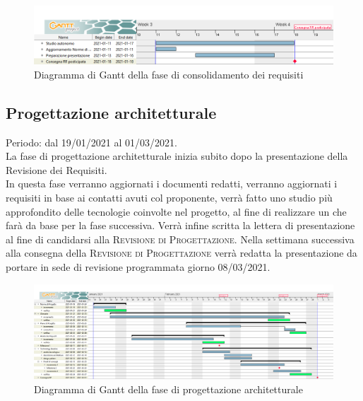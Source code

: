 \documentclass[../piano_di_progetto.tex]{subfiles}
\begin{document}
\begin{figure}[H]
\centering
\includegraphics[width=18cm]{img/01_RR_consolidamento.png}
\caption{ Diagramma di Gantt della fase di consolidamento dei requisiti}
\end{figure}

\subsection{Progettazione architetturale}%
\label{sub:prog_arc}
Periodo: dal 19/01/2021 al 01/03/2021.\\
La fase di progettazione architetturale inizia subito dopo la presentazione della Revisione dei Requisiti.\\
In questa fase verranno aggiornati i documenti redatti, verranno aggiornati i requisiti in base ai contatti avuti col proponente, verrà fatto uno studio più approfondito delle tecnologie coinvolte nel progetto, al fine di realizzare un  che farà da base per la fase successiva. Verrà infine scritta la lettera di presentazione al fine di candidarsi alla \textsc{Revisione di Progettazione}. Nella settimana successiva alla consegna della \textsc{Revisione di Progettazione} verrà redatta la presentazione da portare in sede di revisione programmata giorno 08/03/2021. 

\begin{figure}[H]
\centering
\includegraphics[width=18cm]{img/02_RP.png}
\caption{Diagramma di Gantt della fase di progettazione architetturale}
\end{figure}
\end{document}
